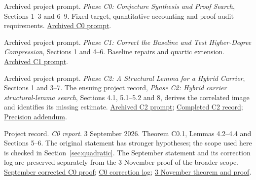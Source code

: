 Archived project prompt. \emph{Phase C0: Conjecture Synthesis and Proof Search}, Sections 1--3 and 6--9. Fixed target, quantitative accounting and proof-audit requirements. \href{https://github.com/hnt119/polynomial-image-compression/blob/145d0e5a6ff725ab13cbb5c696bf335352e6f4a1/research/prompts/Phase_C0_Conjecture_Proof_Search_Prompt.md}{Archived C0 prompt}.

Archived project prompt. \emph{Phase C1: Correct the Baseline and Test Higher-Degree Compression}, Sections 1 and 4--6. Baseline repairs and quartic extension. \href{https://github.com/hnt119/polynomial-image-compression/blob/145d0e5a6ff725ab13cbb5c696bf335352e6f4a1/research/prompts/Phase_C1_Corrections_and_Higher_Degree_Proof_Search_Prompt.md}{Archived C1 prompt}.

Archived project prompt. \emph{Phase C2: A Structural Lemma for a Hybrid Carrier}, Sections 1 and 3--7. The ensuing project record, \emph{Phase C2: Hybrid carrier structural-lemma search}, Sections 4.1, 5.1--5.2 and 8, derives the correlated image and identifies its missing estimate. \href{https://github.com/hnt119/polynomial-image-compression/blob/145d0e5a6ff725ab13cbb5c696bf335352e6f4a1/research/prompts/Phase_C2_Hybrid_Carrier_Structural_Lemma_Prompt.md}{Archived C2 prompt}; \href{https://github.com/hnt119/polynomial-image-compression/blob/145d0e5a6ff725ab13cbb5c696bf335352e6f4a1/research/report-source-supplement/c2/Phase_C2_Hybrid_Carrier_Structural_Lemma.md}{Completed C2 record}; \href{https://github.com/hnt119/polynomial-image-compression/blob/145d0e5a6ff725ab13cbb5c696bf335352e6f4a1/research/report-source-supplement/c2/C2_PRECISION_ADDENDUM.md}{Precision addendum}.

Project record. \emph{C0 report}. 3 September 2026. Theorem C0.1, Lemmas 4.2--4.4 and Sections 5--6. The original statement has stronger hypotheses; the scope used here is checked in Section~\ref{sec:quadratic}. The September statement and its correction log are preserved separately from the 3 November proof of the broader scope. \href{https://github.com/hnt119/polynomial-image-compression/blob/145d0e5a6ff725ab13cbb5c696bf335352e6f4a1/research/report-source-supplement/c0/Phase_C0_Corrected.md}{September corrected C0 proof}; \href{https://github.com/hnt119/polynomial-image-compression/blob/145d0e5a6ff725ab13cbb5c696bf335352e6f4a1/research/report-source-supplement/c0/C0_CORRECTION_LOG.md}{C0 correction log}; \href{https://github.com/hnt119/polynomial-image-compression/blob/145d0e5a6ff725ab13cbb5c696bf335352e6f4a1/research/report-source-supplement/c0/theorem-and-proof.tex}{3 November theorem and proof}.

